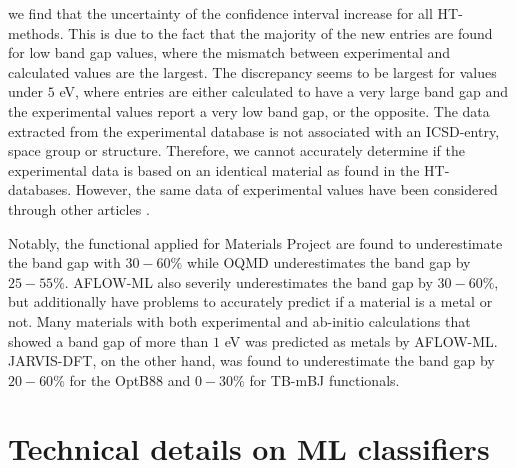\clearpage

\noindent we find that the uncertainty of the confidence interval increase for all HT- methods.
This is due to the fact that the majority of the new entries are found for low band gap values, where the mismatch between experimental and calculated values are the largest.
The discrepancy seems to be largest for values under $5$ eV, where entries are either calculated to have a very large band gap and the experimental values report a very low band gap, or the opposite.
The data extracted from the experimental database is not associated with an ICSD-entry, space group or structure. Therefore, we cannot accurately determine if the experimental data is based on an identical material as found in the HT-databases. However, the same data of experimental values have been considered through other articles \cite{Ward2018, Ferrenti2020}.

Notably, the functional applied for Materials Project are found to underestimate the band gap with $30-60\%$ while OQMD underestimates the band gap by $25-55\%$. AFLOW-ML also severily underestimates the band gap by $30-60\%$, but additionally have problems to accurately predict if a material is a metal or not. Many materials with both experimental and ab-initio calculations that showed a band gap of more than $1$ eV was predicted as metals by AFLOW-ML. JARVIS-DFT, on the other hand, was found to underestimate the band gap by $20-60\%$ for the OptB88 and $0-30\%$ for TB-mBJ functionals.





\section{Technical details on ML classifiers}


